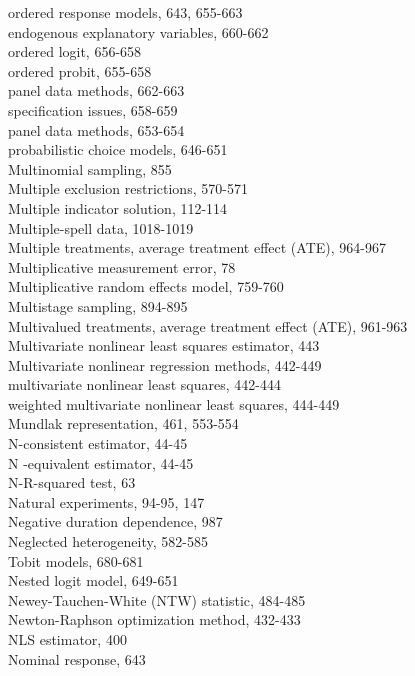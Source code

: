 \documentclass[10pt]{article}
\begin{document}
ordered response models, 643, 655-663\\
endogenous explanatory variables, 660-662\\
ordered logit, 656-658\\
ordered probit, 655-658\\
panel data methods, 662-663\\
specification issues, 658-659\\
panel data methods, 653-654\\
probabilistic choice models, 646-651\\
Multinomial sampling, 855\\
Multiple exclusion restrictions, 570-571\\
Multiple indicator solution, 112-114\\
Multiple-spell data, 1018-1019\\
Multiple treatments, average treatment effect (ATE), 964-967\\
Multiplicative measurement error, 78\\
Multiplicative random effects model, 759-760\\
Multistage sampling, 894-895\\
Multivalued treatments, average treatment effect (ATE), 961-963\\
Multivariate nonlinear least squares estimator, 443\\
Multivariate nonlinear regression methods, 442-449\\
multivariate nonlinear least squares, 442-444\\
weighted multivariate nonlinear least squares, 444-449\\
Mundlak representation, 461, 553-554\\
N-consistent estimator, 44-45\\
N -equivalent estimator, 44-45\\
N-R-squared test, 63\\
Natural experiments, 94-95, 147\\
Negative duration dependence, 987\\
Neglected heterogeneity, 582-585\\
Tobit models, 680-681\\
Nested logit model, 649-651\\
Newey-Tauchen-White (NTW) statistic, 484-485\\
Newton-Raphson optimization method, 432-433\\
NLS estimator, 400\\
Nominal response, 643\\
\end{document}
